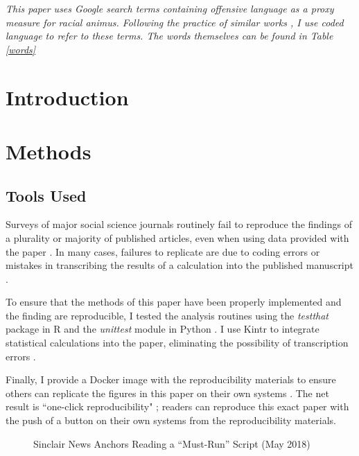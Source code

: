 \documentclass{article}\usepackage[]{graphicx}\usepackage[]{color}
\begin{document}
\title{}
\maketitle{}
\textit{This paper uses Google search terms containing offensive language as a proxy measure for racial animus. Following the practice of similar works \parencites{Stephens_Davidowitz_2014}{Chae_2015}{Chae_2018}{Isoya_2021}, I use coded language to refer to these terms. The words themselves can be found in Table \ref{words}}

\section{Introduction}

\section{Methods}

\subsection{Tools Used}

Surveys of major social science journals routinely fail to reproduce the findings of a plurality or majority of published articles, even when using data provided with the paper \parencites[][]{Nuijten_2015}{Nuijten_2020}{Eubank_2016}.
In many cases, failures to replicate are due to coding errors or mistakes in transcribing the results of a calculation into the published manuscript \parencite[][]{Eubank_2016}.

To ensure that the methods of this paper have been properly implemented and the finding are reproducible, I tested the analysis routines using the \textit{testthat} package in R \parencite[][]{testthat} and the \textit{unittest} module in Python \parencite[][]{Python}.
I use Kintr to integrate statistical calculations into the paper, eliminating the possibility of transcription errors \parencite[][]{knitr}.

Finally, I provide a Docker image \parencite[][]{docker} with the reproducibility materials to ensure others can replicate the figures in this paper on their own systems \parencite{Boettiger_2015}.
The net result is ``one-click reproducibility" \parencite[][]{N_st_2020}; readers can reproduce this exact paper with the push of a button on their own systems from the reproducibility materials.


\begin{figure}
\caption{Sinclair News Anchors Reading a ``Must-Run'' Script (May 2018)}

\end{figure}
\end{document}
